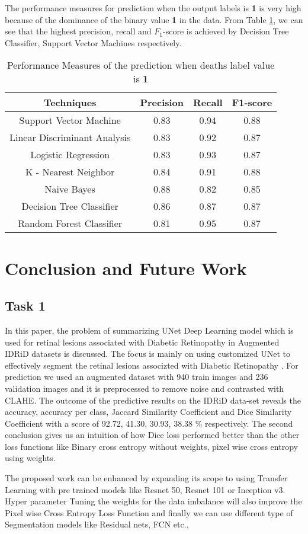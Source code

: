 \documentclass[conference]{IEEEtran}
\begin{document}
The performance measures for prediction when the output labels is \textbf{1} is very high because of the dominance of the binary value \textbf{1} in the data. From Table \ref{table:3}, we can see that the highest precision, recall and $F_1$-score is achieved by Decision Tree Classifier, Support Vector Machines respectively. 
\begin{table}[H]
\centering
 \begin{tabular}{|c| c c c|} 
 \hline
 Techniques  & Precision & Recall & F1-score \\ [0.5ex] 
 \hline
 Support Vector Machine & 0.83 & 0.94 & 0.88 \\ 
 \hline
 Linear Discriminant Analysis & 0.83 & 0.92 & 0.87\\
 \hline
 Logistic Regression & 0.83 & 0.93 & 0.87\\
 \hline
 K - Nearest Neighbor & 0.84 & 0.91 & 0.88\\
 \hline
 Naive Bayes & 0.88 & 0.82 & 0.85\\  
 \hline
 Decision Tree Classifier & 0.86 & 0.87 & 0.87 \\
 \hline
 Random Forest Classifier & 0.81 & 0.95 & 0.87  \\[0.75ex] 
 \hline
\end{tabular}
\vspace*{0.25cm}
\caption{Performance Measures of the prediction when deaths label value is \textbf{1}}
\label{table:3}
\end{table}


\section{Conclusion and Future Work}
\subsection{Task 1}
In this paper, the problem of summarizing UNet Deep Learning model which is used for retinal lesions associated with Diabetic Retinopathy in Augmented IDRiD datasets is discussed. The focus is mainly on using customized UNet to effectively segment the retinal lesions associzted with Diabetic Retinopathy \cite{monoclonal1} . For prediction we used an augmented dataset with 940 train images and 236 validation images and it is preprocessed to remove noise and contrasted with CLAHE. The outcome of the predictive results on the IDRiD data-set reveals the accuracy, accuracy per class, Jaccard Similarity Coefficient and Dice Similarity Coefficient with a score of 92.72, 41.30, 30.93, 38.38 \% respectively. The second conclusion gives us an intuition of how Dice loss performed better than the other loss functions like Binary cross entropy without weights, pixel wise cross entropy using weights.
\par 
The proposed work can be enhanced by expanding its scope to using Transfer Learning with pre trained models like Resnet 50, Resnet 101 or Inception v3. Hyper parameter Tuning the weights for the data imbalance will also improve the Pixel wise Cross Entropy Loss Function and finally we can use different type of Segmentation models like Residual nets, FCN etc.,
\end{document}
